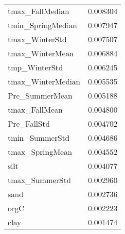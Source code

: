 \begin{tabular}{lr}
tmax_FallMedian & 0.008304 \\
tmin_SpringMedian & 0.007947 \\
tmax_WinterStd & 0.007507 \\
tmax_WinterMean & 0.006884 \\
tmp_WinterStd & 0.006245 \\
tmax_WinterMedian & 0.005535 \\
Pre_SummerMean & 0.005188 \\
tmax_FallMean & 0.004800 \\
Pre_FallStd & 0.004702 \\
tmin_SummerStd & 0.004686 \\
tmax_SpringMean & 0.004552 \\
silt & 0.004077 \\
tmax_SummerStd & 0.002960 \\
sand & 0.002736 \\
orgC & 0.002223 \\
clay & 0.001474 \\
\bottomrule
\end{tabular}
